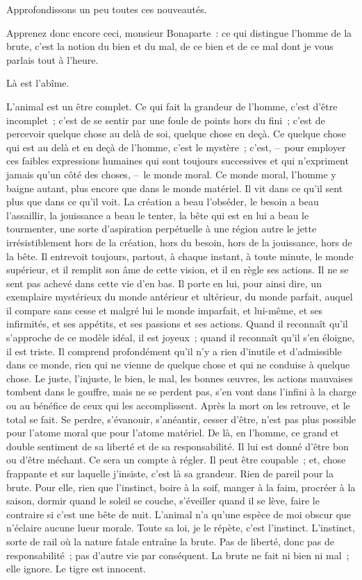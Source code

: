 \documentclass[french,twoside]{book} %
\begin{document}
Approfondissons un peu toutes ces nouveautés.\par
Apprenez donc encore ceci, monsieur Bonaparte : ce qui distingue l’homme de la brute, c’est la notion du bien et du mal, de ce bien et de ce mal dont je vous parlais tout à l’heure.\par
Là est l’abîme.\par
L’animal est un être complet. Ce qui fait la grandeur de l’homme, c’est d’être incomplet ; c’est de se sentir par une foule de points hors du fini ; c’est de percevoir quelque chose au delà de soi, quelque chose en deçà. Ce quelque chose qui est au delà et en deçà de l’homme, c’est le mystère ; c’est, – pour employer ces faibles expressions humaines qui sont toujours successives et qui n’expriment jamais qu’un côté des choses, – le monde moral. Ce monde moral, l’homme y baigne autant, plus encore que dans le monde matériel. Il vit dans ce qu’il sent plus que dans ce qu’il voit. La création a beau l’obséder, le besoin a beau l’assaillir, la jouissance a beau le tenter, la bête qui est en lui a beau le tourmenter, une sorte d’aspiration perpétuelle à une région autre le jette irrésistiblement hors de la création, hors du besoin, hors de la jouissance, hors de la bête. Il entrevoit toujours, partout, à chaque instant, à toute minute, le monde supérieur, et il remplit son âme de cette vision, et il en règle ses actions. Il ne se sent pas achevé dans cette vie d’en bas. Il porte en lui, pour ainsi dire, un exemplaire mystérieux du monde antérieur et ultérieur, du monde parfait, auquel il compare sans cesse et malgré lui le monde imparfait, et lui-même, et ses infirmités, et ses appétits, et ses passions et ses actions. Quand il reconnaît qu’il s’approche de ce modèle idéal, il est joyeux ; quand il reconnaît qu’il s’en éloigne, il est triste. Il comprend profondément qu’il n’y a rien d’inutile et d’admissible dans ce monde, rien qui ne vienne de quelque chose et qui ne conduise à quelque chose. Le juste, l’injuste, le bien, le mal, les bonnes œuvres, les actions mauvaises tombent dans le gouffre, mais ne se perdent pas, s’en vont dans l’infini à la charge ou au bénéfice de ceux qui les accomplissent. Après la mort on les retrouve, et le total se fait. Se perdre, s’évanouir, s’anéantir, cesser d’être, n’est pas plus possible pour l’atome moral que pour l’atome matériel. De là, en l’homme, ce grand et double sentiment de sa liberté et de sa responsabilité. Il lui est donné d’être bon ou d’être méchant. Ce sera un compte à régler. Il peut être coupable ; et, chose frappante et sur laquelle j’insiste, c’est là sa grandeur. Rien de pareil pour la brute. Pour elle, rien que l’instinct, boire à la soif, manger à la faim, procréer à la saison, dormir quand le soleil se couche, s’éveiller quand il se lève, faire le contraire si c’est une bête de nuit. L’animal n’a qu’une espèce de moi obscur que n’éclaire aucune lueur morale. Toute sa loi, je le répète, c’est l’instinct. L’instinct, sorte de rail où la nature fatale entraîne la brute. Pas de liberté, donc pas de responsabilité ; pas d’autre vie par conséquent. La brute ne fait ni bien ni mal ; elle ignore. Le tigre est innocent.\par
\end{document}
